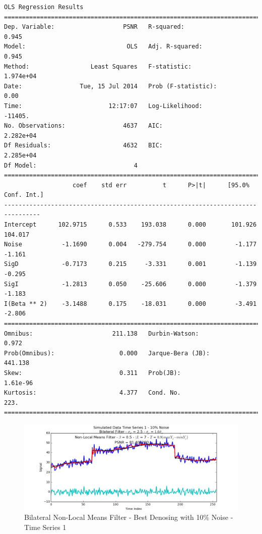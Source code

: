\documentclass[11pt]{article}
\theoremstyle{definition}
\begin{document}
{\begin{lstlisting}[caption = Time Series 3 - Bilateral Non-Local Means Filter OLS Model, label = {bilateralnlmeans3}]
                            OLS Regression Results                            
==============================================================================
Dep. Variable:                   PSNR   R-squared:                       0.945
Model:                            OLS   Adj. R-squared:                  0.945
Method:                 Least Squares   F-statistic:                 1.974e+04
Date:                Tue, 15 Jul 2014   Prob (F-statistic):               0.00
Time:                        12:17:07   Log-Likelihood:                -11405.
No. Observations:                4637   AIC:                         2.282e+04
Df Residuals:                    4632   BIC:                         2.285e+04
Df Model:                           4                                         
================================================================================
                   coef    std err          t      P>|t|      [95.0% Conf. Int.]
--------------------------------------------------------------------------------
Intercept      102.9715      0.533    193.038      0.000       101.926   104.017
Noise           -1.1690      0.004   -279.754      0.000        -1.177    -1.161
SigD            -0.7173      0.215     -3.331      0.001        -1.139    -0.295
SigI            -1.2813      0.050    -25.606      0.000        -1.379    -1.183
I(Beta ** 2)    -3.1488      0.175    -18.031      0.000        -3.491    -2.806
==============================================================================
Omnibus:                      211.138   Durbin-Watson:                   0.972
Prob(Omnibus):                  0.000   Jarque-Bera (JB):              441.138
Skew:                           0.311   Prob(JB):                     1.61e-96
Kurtosis:                       4.377   Cond. No.                         223.
==============================================================================
\end{lstlisting}
}

\begin{figure}
\centering
\includegraphics[width = 0.75 \textwidth]{BilateralNLMeansSignal1Best.png}
\caption{Bilateral Non-Local Means Filter - Best Denosing with 10\% Noise - Time Series 1}
\label{bilateralnlmeans1best}
\end{figure}
\end{document}
